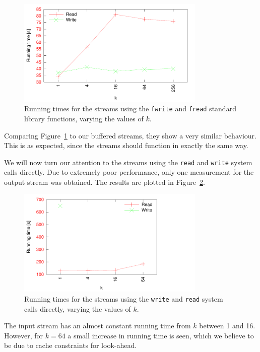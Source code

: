 \documentclass[a4paper,12pt]{article}
\begin{document}
\begin{figure}[h!]
  \centering
  \includegraphics[width=0.8\textwidth]{fstreams}
  \caption{Running times for the streams using the \texttt{fwrite} and
    \texttt{fread} standard library functions, varying the values of
    $k$.}
  \label{fig:fstreams}
\end{figure}

Comparing Figure~\ref{fig:fstreams} to our buffered streams, they show
a very similar behaviour. This is as expected, since the streams
should function in exactly the same way.

We will now turn our attention to the streams using the \texttt{read}
and \texttt{write} system calls directly. Due to extremely poor
performance, only one measurement for the output stream was
obtained. The results are plotted in Figure~\ref{fig:syscall-streams}.

\begin{figure}[h!]
  \centering
  \includegraphics[width=0.8\textwidth]{syscall_streams}
  \caption{Running times for the streams using the \texttt{write} and
    \texttt{read} system calls directly, varying the values of $k$.}
  \label{fig:syscall-streams}
\end{figure}

The input stream has an almost constant running time from $k$ between
1 and 16. However, for $k = 64$ a small increase in running time is
seen, which we believe to be due to cache constraints for look-ahead.
\end{document}
